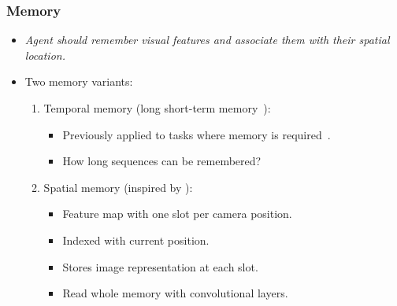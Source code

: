 \begin{frame}
    \frametitle{Memory}

    \begin{itemize}
        \item \textit{Agent should remember visual features and associate them with their spatial location.}
        \item Two memory variants:
        \begin{enumerate}
            \item Temporal memory (long short-term memory~\cite{hochreiter_long_1997}):
            \begin{itemize}
                \item Previously applied to tasks where memory is required~\cite{hausknecht_deep_2017,mnih_asynchronous_2016,mirowski_learning_2017,gupta_cognitive_2019}.
                \item How long sequences can be remembered?
            \end{itemize}
            \item Spatial memory (inspired by \cite{parisotto_neural_2017}):
            \begin{itemize}
                \item Feature map with one slot per camera position.
                \item Indexed with current position.
                \item Stores image representation at each slot.
                \item Read whole memory with convolutional layers.
            \end{itemize}
        \end{enumerate}
    \end{itemize}
\end{frame}

